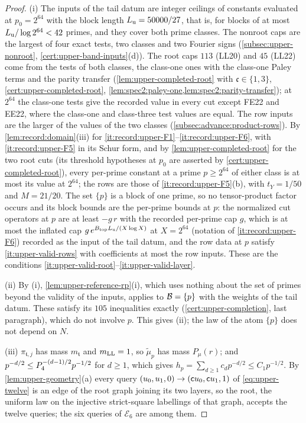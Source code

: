 \begin{proof}
(i) The inputs of the tail datum are integer ceilings of constants evaluated
at $p_0=2^{64}$ with the block length $L_{\rm u}=50000/27$, that is, for blocks
of at most $L_{\rm u}/\log2^{64}<42$ primes, and they cover both prime
classes. The nonroot caps are the largest of four exact tests, two classes
and two Fourier signs (\cref{subsec:upper-nonroot},
\cref{cert:upper-band-inputs}(d)). The root caps $113$ (LL20) and $45$ (LL22)
come from the tests of both classes, the class-one ones with the class-one
Paley terms and the parity transfer (\cref{lem:upper-completed-root} with
$\mathfrak c\in\{1,3\}$, \cref{cert:upper-completed-root},
\cref{lem:spec2:paley-one,lem:spec2:parity-transfer}); at $2^{64}$ the
class-one tests give the recorded value in every cut except FE22 and EE22,
where the class-one and class-three test values are equal. The row inputs are the larger of the values of the
two classes (\cref{subsec:advance:product-rows}). By
\cref{lem:record:domain}(iii) for \ref{it:record:upper-F1}--\ref{it:record:upper-F6},
with \ref{it:record:upper-F5} in its Schur form, and by
\cref{lem:upper-completed-root} for the two root cuts (its threshold
hypotheses at $p_0$ are asserted by \cref{cert:upper-completed-root}), every
per-prime constant at a prime $p\ge2^{64}$ of either class is at most its
value at $2^{64}$; the rows are those of \ref{it:record:upper-F5}(b), with
$t_Y=1/50$ and $M=21/20$. The set $\{p\}$ is a block of one prime, so no tensor-product factor occurs and its block bounds are the per-prime bounds at $p$:
the normalized cut operators at $p$ are at least $-g\,r$ with the recorded
per-prime cap $g$, which is at most the inflated cap
$g\,e^{B_{\rm top}L_{\rm u}/(X\log X)}$ at $X=2^{64}$ (notation of \ref{it:record:upper-F6}) recorded as the input of the tail
datum, and the row data at $p$ satisfy \ref{it:upper-valid-rows} with
coefficients at most the row inputs. These are the conditions
\ref{it:upper-valid-root}--\ref{it:upper-valid-layer}.

(ii) By (i), \cref{lem:upper-reference-rp}(i), which uses nothing about the
set of primes beyond the validity of the inputs, applies to $\mathcal B=\{p\}$ with
the weights of the tail datum. These satisfy its $105$ inequalities exactly
(\cref{cert:upper-completion}, last paragraph), which do not involve $p$.
This gives (ii); the law of the atom $\{p\}$ does not depend on $N$.

(iii) $\pi_{\mathfrak t,j}$ has mass $m_{\mathfrak t}$ and $m_{\rm LL}=1$, so
$\widetilde\mu_p$ has mass $P_\mu(r)$; and $p^{-d/2}\le P_4^{-(d-1)/2}p^{-1/2}$
for $d\ge1$, which gives $h_p=\sum_{d\ge1}c_dp^{-d/2}\le C_1p^{-1/2}$. By
\cref{lem:upper-geometry}(a) every query
$(u_0,u_1,0)\to(\mathsf c u_0,\mathsf c u_1,1)$ of \eqref{eq:upper-twelve} is an edge of
the root graph joining its two layers, so the root, the uniform law on the
injective strict-square labellings of that graph, accepts the twelve queries;
the six queries of $\mathcal E_6$ are among them.
\end{proof}

